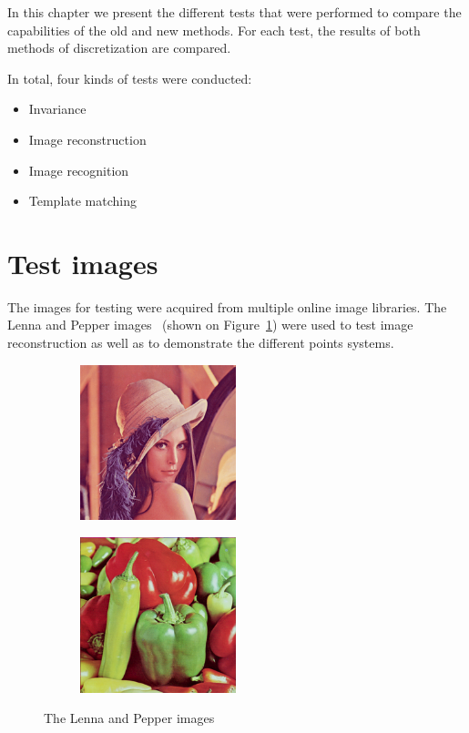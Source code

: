 In this chapter we present the different tests that were performed to compare the capabilities of the old and new methods. For each test, the results of both methods of discretization are compared.

In total, four kinds of tests were conducted:
\begin{itemize}
	\item Invariance
	\item Image reconstruction
	\item Image recognition
	\item Template matching
\end{itemize}

\section{Test images}\label{sec:test_images}
The images for testing were acquired from multiple online image libraries. The Lenna and Pepper images~\cite{usc_sipi} (shown on Figure~\ref{fig:lena_pepper_original}) were used to test image reconstruction as well as to demonstrate the different points systems.

\begin{figure}[tbp]
    \begin{subfigure}{0.49\textwidth}
        \centering
    \includegraphics[width=128pt]{figures/lenna_color_256.png}
    \caption{}
	\end{subfigure}
	\begin{subfigure}{0.49\textwidth}
        \centering
    \includegraphics[width=128pt]{figures/pepper_color_256.png}
    \caption{}
	\end{subfigure}
	\caption{The Lenna and Pepper images}
	\label{fig:lena_pepper_original}
\end{figure}

